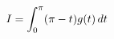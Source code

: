 \documentclass[preview]{standalone}
\begin{document}
\begin{align*}
\special{dvisvgm:raw <g id='unique000'>}I=\int_0^\pi(\pi-t)g(t)\,dt\special{dvisvgm:raw </g>}
\end{align*}
\end{document}
